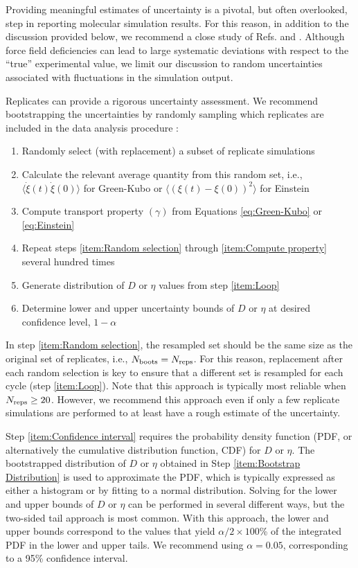\documentclass[9pt,bestpractices]{livecoms}
\begin{document}
Providing meaningful estimates of uncertainty is a pivotal, but often overlooked, step in reporting molecular simulation results. For this reason, in addition to the discussion provided below, we recommend a close study of Refs. \cite{GUM} and \cite{Grossfield2018}. Although force field deficiencies can lead to large systematic deviations with respect to the ``true'' experimental value, we limit our discussion to random uncertainties associated with fluctuations in the simulation output.

Replicates can provide a rigorous uncertainty assessment. We recommend bootstrapping the uncertainties by randomly sampling which replicates are included in the data analysis procedure \cite{Efron1979}:

\begin{enumerate}
	\item Randomly select (with replacement) a subset of replicate simulations \label{item:Random selection}
	\item Calculate the relevant average quantity from this random set, i.e., $\langle\dot{\xi}(t)\dot{\xi}(0)\rangle$ for Green-Kubo or $\langle (\xi(t)-\xi(0))^2 \rangle$ for Einstein
	\item Compute transport property $(\gamma)$ from Equations \ref{eq:Green-Kubo} or \ref{eq:Einstein} \label{item:Compute property}
	\item Repeat steps \ref{item:Random selection} through \ref{item:Compute property} several hundred times \label{item:Loop}
	\item Generate distribution of $D$ or $\eta$ values from step \ref{item:Loop} \label{item:Bootstrap Distribution}
	\item Determine lower and upper uncertainty bounds of $D$ or $\eta$ at desired confidence level, $1-\alpha$ \label{item:Confidence interval}
\end{enumerate}
In step \ref{item:Random selection}, the resampled set should be the same size as the original set of replicates, i.e., $N_{\rm boots} = N_{\rm reps}$. For this reason, replacement after each random selection is key to ensure that a different set is resampled for each cycle (step \ref{item:Loop}). Note that this approach is typically most reliable when $N_{\rm reps} \ge 20$. However, we recommend this approach even if only a few replicate simulations are performed to at least have a rough estimate of the uncertainty.
 
Step \ref{item:Confidence interval} requires the probability density function (PDF, or alternatively the cumulative distribution function, CDF) for $D$ or $\eta$. The bootstrapped distribution of $D$ or $\eta$ obtained in Step \ref{item:Bootstrap Distribution} is used to approximate the PDF, which is typically expressed as either a histogram or by fitting to a normal distribution. Solving for the lower and upper bounds of $D$ or $\eta$ can be performed in several different ways, but the two-sided tail approach is most common. With this approach, the lower and upper bounds correspond to the values that yield $\alpha/2 \times 100$\% of the integrated PDF in the lower and upper tails. We recommend using $\alpha = 0.05$, corresponding to a 95\% confidence interval.
\end{document}
